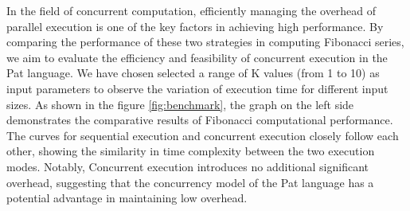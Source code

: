\documentclass{l4proj}
\begin{document}
\begin{table}[ht]
\centering
\renewcommand{\arraystretch}{1.1}
\caption{Part List of Savina Benchmarks}
\label{Savina}
\end{table}

In the field of concurrent computation, efficiently managing the overhead of parallel execution is one of the key factors in achieving high performance. By comparing the performance of these two strategies in computing Fibonacci series, we aim to evaluate the efficiency and feasibility of concurrent execution in the Pat language. We have chosen selected a range of K values (from 1 to 10) as input parameters to observe the variation of execution time for different input sizes. As shown in the figure \ref{fig:benchmark}, the graph on the left side demonstrates the comparative results of Fibonacci computational performance. The curves for sequential execution and concurrent execution closely follow each other, showing the similarity in time complexity between the two execution modes. Notably, Concurrent execution introduces no additional significant overhead, suggesting that the concurrency model of the Pat language has a potential advantage in maintaining low overhead.
\end{document}
